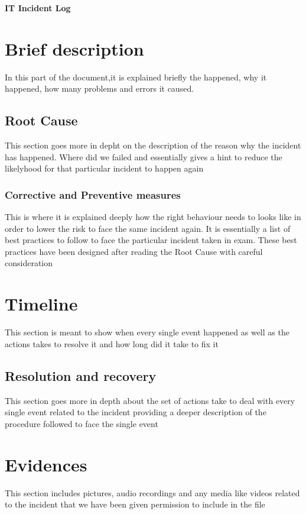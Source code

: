 \documentclass[a4paper,12pt]{article}
\begin{document}
\textbf{IT Incident Log}


\tableofcontents
\clearpage

\Large
\section{Brief description}
\normalsize
In this part of the document,it is explained briefly the  happened, why it happened, how many problems and errors it caused.

\Large
\subsection{Root Cause}
\normalsize
This section goes more in depht on the description of the reason why the incident has happened. Where did we failed and essentially gives a hint to reduce the likelyhood for that particular incident to happen again

\Large
\subsubsection{Corrective and Preventive measures}
\normalsize
This is where it is explained deeply how the right behaviour needs to looks like in order to lower the risk to face the same incident again. It is essentially a list of best practices to follow to face the particular incident taken in exam. These best practices have been designed after reading the Root Cause with careful consideration

\Large
\section{Timeline}
\normalsize
This section is meant to show when every single event happened as well as the actions takes to resolve it and how long did it take to fix it

\Large
\subsection{Resolution and recovery}
\normalsize
This section goes more in depth about the set of actions take to deal with every single event related to the incident providing a deeper description of the procedure followed to face the single event
\clearpage


\Large
\section{Evidences}
\normalsize
This section includes pictures, audio recordings and any media like videos related to the incident that we have been given permission to include in the file
\end{document}
